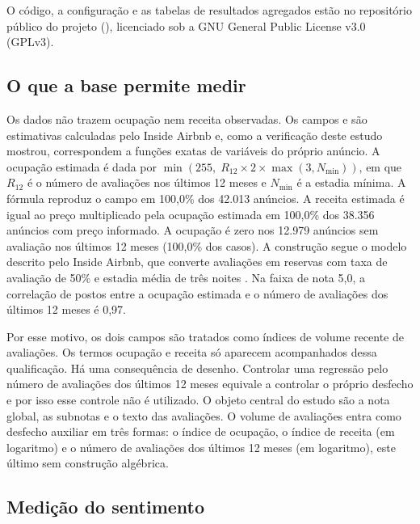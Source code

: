 O código, a configuração e as tabelas de resultados agregados estão no repositório público do projeto (), licenciado sob a GNU General Public License v3.0 (GPLv3).

\subsection{O que a base permite medir}

Os dados não trazem ocupação nem receita observadas. Os campos  e  são estimativas calculadas pelo Inside Airbnb e, como a verificação deste estudo mostrou, correspondem a funções exatas de variáveis do próprio anúncio. A ocupação estimada é dada por $\min(255,\; R_{12} \times 2 \times \max(3, N_{\min}))$, em que $R_{12}$ é o número de avaliações nos últimos 12 meses e $N_{\min}$ é a estadia mínima. A fórmula reproduz o campo em 100,0\% dos 42.013 anúncios. A receita estimada é igual ao preço multiplicado pela ocupação estimada em 100,0\% dos 38.356 anúncios com preço informado. A ocupação é zero nos 12.979 anúncios sem avaliação nos últimos 12 meses (100,0\% dos casos). A construção segue o modelo descrito pelo Inside Airbnb, que converte avaliações em reservas com taxa de avaliação de 50\% e estadia média de três noites \citep{insideairbnb}. Na faixa de nota 5,0, a correlação de postos entre a ocupação estimada e o número de avaliações dos últimos 12 meses é 0,97.

Por esse motivo, os dois campos são tratados como índices de volume recente de avaliações. Os termos ocupação e receita só aparecem acompanhados dessa qualificação. Há uma consequência de desenho. Controlar uma regressão pelo número de avaliações dos últimos 12 meses equivale a controlar o próprio desfecho e por isso esse controle não é utilizado. O objeto central do estudo são a nota global, as subnotas e o texto das avaliações. O volume de avaliações entra como desfecho auxiliar em três formas: o índice de ocupação, o índice de receita (em logaritmo) e o número de avaliações dos últimos 12 meses (em logaritmo), este último sem construção algébrica.

\subsection{Medição do sentimento}

